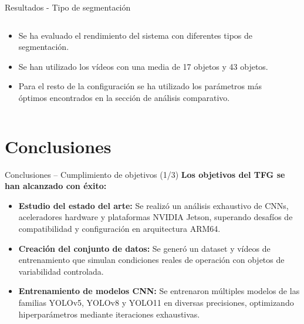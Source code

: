 \documentclass[spanish]{beamer}
\begin{document}
\begin{frame}{Resultados - Tipo de segmentación}
    \begin{columns}
        \begin{column}{0.5\textwidth}
            \begin{itemize}
                \item Se ha evaluado el rendimiento del sistema con diferentes tipos de segmentación.
                \item Se han utilizado los vídeos con una media de 17 objetos y 43 objetos.
                \item Para el resto de la configuración se ha utilizado los parámetros más óptimos encontrados en la sección de análisis comparativo.
            \end{itemize}
        \end{column}
        \begin{column}{0.5\textwidth}

        \end{column}
    \end{columns}
\end{frame}

\section{Conclusiones}
\begin{frame}{Conclusiones -- Cumplimiento de objetivos (1/3)}
    \textbf{Los objetivos del TFG se han alcanzado con éxito:}
    \begin{itemize}
        \item \textbf{Estudio del estado del arte:} Se realizó un análisis exhaustivo de CNNs, aceleradores hardware y plataformas NVIDIA Jetson, superando desafíos de compatibilidad y configuración en arquitectura ARM64.
        \item \textbf{Creación del conjunto de datos:} Se generó un dataset y vídeos de entrenamiento que simulan condiciones reales de operación con objetos de variabilidad controlada.
        \item \textbf{Entrenamiento de modelos CNN:} Se entrenaron múltiples modelos de las familias YOLOv5, YOLOv8 y YOLO11 en diversas precisiones, optimizando hiperparámetros mediante iteraciones exhaustivas.
    \end{itemize}
\end{frame}
\end{document}

